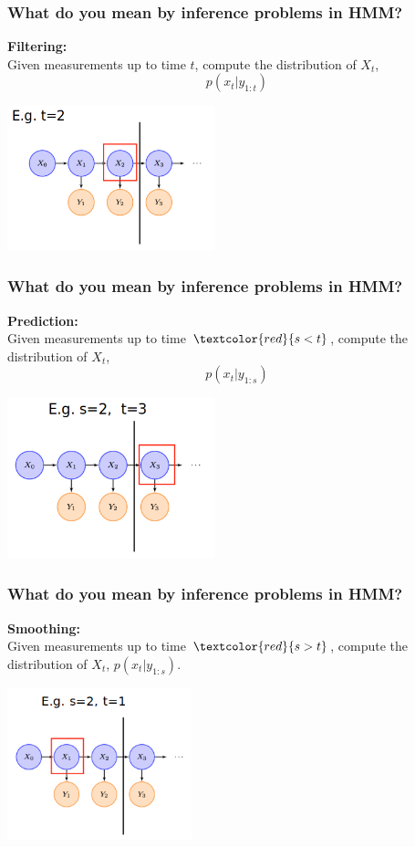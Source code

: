 \documentclass[xcolor=dvipsnames, compress]{beamer}
\begin{document}
\begin{frame}
\frametitle{What do you mean by inference problems in HMM?}
 \textbf{Filtering:}\\
  Given measurements up to time $t$, compute the distribution of $X_t$, $$p(x_{t}|y_{1:t})$$
\begin{center}
	\includegraphics[width=0.45\textwidth]{images/m_filtering.png}
\end{center}
\end{frame}

\begin{frame}
\frametitle{What do you mean by inference problems in HMM?}
\textbf{Prediction:}\\ Given measurements up to time $\textcolor{red}{s<t}$, compute the distribution of $X_t$, $$p(x_{t}|y_{1:s})$$ 
\begin{center}
	\includegraphics[width=0.45\textwidth]{images/m_smooth.png}
\end{center}

\end{frame}

\begin{frame}
\frametitle{What do you mean by inference problems in HMM?}
 \textbf{Smoothing:}\\ Given measurements up to time $\textcolor{red}{s>t}$, compute the distribution of $X_t$, $p(x_{t}|y_{1:s})$.
\begin{center}
	\includegraphics[width=0.4\textwidth]{images/m_smooth2.png}
\end{center}

\end{frame}
\end{document}
